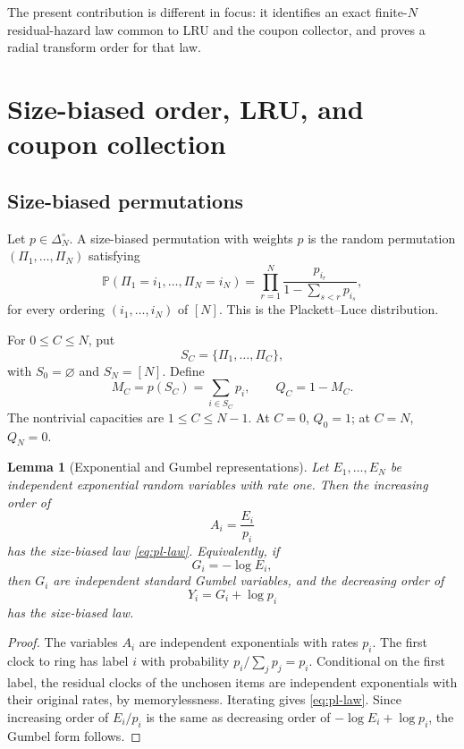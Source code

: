 \documentclass[11pt]{article}
\newtheorem{lemma}[theorem]{Lemma}
\newcommand{\Pbb}{\mathbb P}
\newcommand{\1}{\mathbf 1}
\begin{document}
The present contribution is different in focus: it identifies an exact finite-$N$
residual-hazard law common to LRU and the coupon collector, and proves a radial transform
order for that law.

\section{Size-biased order, LRU, and coupon collection}

\subsection{Size-biased permutations}

Let $p\in\Delta_N^\circ$.  A size-biased permutation with weights $p$ is the random
permutation $(\Pi_1,\ldots,\Pi_N)$ satisfying
\begin{equation}\label{eq:pl-law}
        \Pbb(\Pi_1=i_1,\ldots,\Pi_N=i_N)
        =\prod_{r=1}^N \frac{p_{i_r}}{1-\sum_{s<r}p_{i_s}},
\end{equation}
for every ordering $(i_1,\ldots,i_N)$ of $[N]$.  This is the
Plackett--Luce distribution.

For $0\le C\le N$, put
\[
        S_C=\{\Pi_1,\ldots,\Pi_C\},
\]
with $S_0=\varnothing$ and $S_N=[N]$.  Define
\[
        M_C=p(S_C)=\sum_{i\in S_C}p_i,
        \qquad
        Q_C=1-M_C.
\]
The nontrivial capacities are $1\le C\le N-1$.  At $C=0$, $Q_0=1$; at $C=N$,
$Q_N=0$.

\begin{lemma}[Exponential and Gumbel representations]\label{lem:gumbel}
Let $E_1,\ldots,E_N$ be independent exponential random variables with rate one.  Then the
increasing order of
\[
        A_i=\frac{E_i}{p_i}
\]
has the size-biased law \eqref{eq:pl-law}.  Equivalently, if
\[
        G_i=-\log E_i,
\]
then $G_i$ are independent standard Gumbel variables, and the decreasing order of
\[
        Y_i=G_i+\log p_i
\]
has the size-biased law.
\end{lemma}

\begin{proof}
The variables $A_i$ are independent exponentials with rates $p_i$.  The first clock to
ring has label $i$ with probability $p_i/\sum_jp_j=p_i$.  Conditional on the first label,
the residual clocks of the unchosen items are independent exponentials with their original
rates, by memorylessness.  Iterating gives \eqref{eq:pl-law}.  Since increasing order of
$E_i/p_i$ is the same as decreasing order of $-\log E_i+\log p_i$, the Gumbel form follows.
\end{proof}
\end{document}
